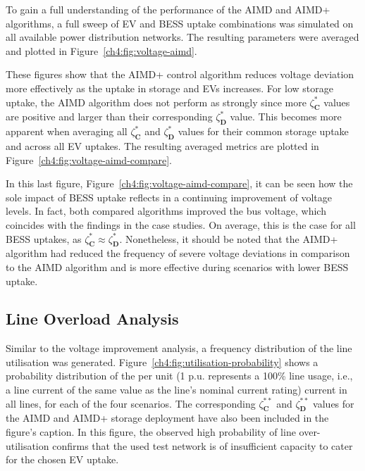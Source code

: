 

To gain a full understanding of the performance of the AIMD and AIMD+ algorithms, a full sweep of EV and BESS uptake combinations was simulated on all available power distribution networks.
The resulting parameters were averaged and plotted in Figure~\ref{ch4:fig:voltage-aimd}.

These figures show that the AIMD+ control algorithm reduces voltage deviation more effectively as the uptake in storage and EVs increases.
For low storage uptake, the AIMD algorithm does not perform as strongly since more $\zeta_\textbf{C}^{*}$ values are positive and larger than their corresponding $\zeta_\textbf{D}^{*}$ value.
This becomes more apparent when averaging all $\zeta_\textbf{C}^{*}$ and $\zeta_\textbf{D}^{*}$ values for their common storage uptake and across all EV uptakes.
The resulting averaged metrics are plotted in Figure~\ref{ch4:fig:voltage-aimd-compare}.



In this last figure, Figure~\ref{ch4:fig:voltage-aimd-compare}, it can be seen how the sole impact of BESS uptake reflects in a continuing improvement of voltage levels.
In fact, both compared algorithms improved the bus voltage, which coincides with the findings in the case studies.
On average, this is the case for all BESS uptakes, as $\zeta_\textbf{C}^{*} \approx \zeta_\textbf{D}^{*}$.
Nonetheless, it should be noted that the AIMD+ algorithm had reduced the frequency of severe voltage deviations in comparison to the AIMD algorithm and is more effective during scenarios with lower BESS uptake.

\subsection{Line Overload Analysis}



Similar to the voltage improvement analysis, a frequency distribution of the line utilisation was generated.
Figure~\ref{ch4:fig:utilisation-probability} shows a probability distribution of the per unit (1 p.u. represents a 100\% line usage, i.e., a line current of the same value as the line's nominal current rating) current in all lines, for each of the four scenarios.
The corresponding $\zeta_\textbf{C}^{**}$ and $\zeta_\textbf{D}^{**}$ values for the AIMD and AIMD+ storage deployment have also been included in the figure's caption.
In this figure, the observed high probability of line over-utilisation confirms that the used test network is of insufficient capacity to cater for the chosen EV uptake.

